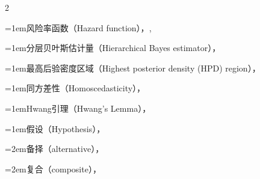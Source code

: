 \begin{multicols}{2}
\par\addvspace{2pt}
\par\noindent\hangindent=1em\hspace*{0em}\label{idx:469}风险率函数（Hazard function），\hyperref[idxocc:469:114]{\pageref*{idxocc:469:114}}, \hyperref[exercise:3.25]{\pageref*{exercise:3.25}}\par
\par\addvspace{2pt}
\par\noindent\hangindent=1em\hspace*{0em}\label{idx:470}分层贝叶斯估计量（Hierarchical Bayes estimator），\hyperref[idxocc:470:332]{\pageref*{idxocc:470:332}}\par
\par\addvspace{2pt}
\par\noindent\hangindent=1em\hspace*{0em}\label{idx:471}最高后验密度区域（Highest posterior density (HPD) region），\hyperref[cor:9.3.10]{\pageref*{cor:9.3.10}}\par
\par\addvspace{2pt}
\par\noindent\hangindent=1em\hspace*{0em}\label{idx:472}同方差性（Homoscedasticity），\hyperref[item:11.2.assumption.iii]{\pageref*{item:11.2.assumption.iii}}\par
\par\addvspace{2pt}
\par\noindent\hangindent=1em\hspace*{0em}\label{idx:473}Hwang引理（Hwang’s Lemma），\hyperref[thm:3.6.8]{\pageref*{thm:3.6.8}}\par
\par\addvspace{2pt}
\par\noindent\hangindent=1em\hspace*{0em}\label{idx:474}假设（Hypothesis），\hyperref[def:8.1.1]{\pageref*{def:8.1.1}}\par
\par\noindent\hangindent=2em\hspace*{1em}\label{idx:475}备择（alternative），\hyperref[def:8.1.2]{\pageref*{def:8.1.2}}\par
\par\noindent\hangindent=2em\hspace*{1em}\label{idx:476}复合（composite），\hyperref[idxocc:476:348]{\pageref*{idxocc:476:348}}\par

\end{multicols}
